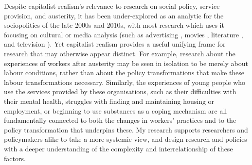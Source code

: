 Despite capitalist realism’s relevance to research on social policy, service provision, and austerity, it has been under-explored as an analytic for the sociopolitics of the late 2000s and 2010s, with most research which uses it focusing on cultural or media analysis (such as advertising \citep{schudson_advertising_2013}, movies \citep{flisfeder_love_2017}, literature \citep{tally_jr_for_2022}, and television \citep{la_berge_capitalist_2010}). Yet capitalist realism provides a useful unifying frame for research that may otherwise appear distinct. For example, research about the experiences of workers after austerity may be seen in isolation to be merely about labour conditions, rather than about the policy transformations that make these labour transformations necessary. Similarly, the experiences of young people who use the services provided by these organisations, such as their difficulties with their mental health, struggles with finding and maintaining housing or employment, or beginning to use substances as a coping mechanism are all fundamentally connected to both the changes in workers' practices and to the policy transformation that underpins these. My research supports researchers and policymakers alike to take a more systemic view, and design research and policies with a deeper understanding of the complexity and interrelationship of these factors. 

